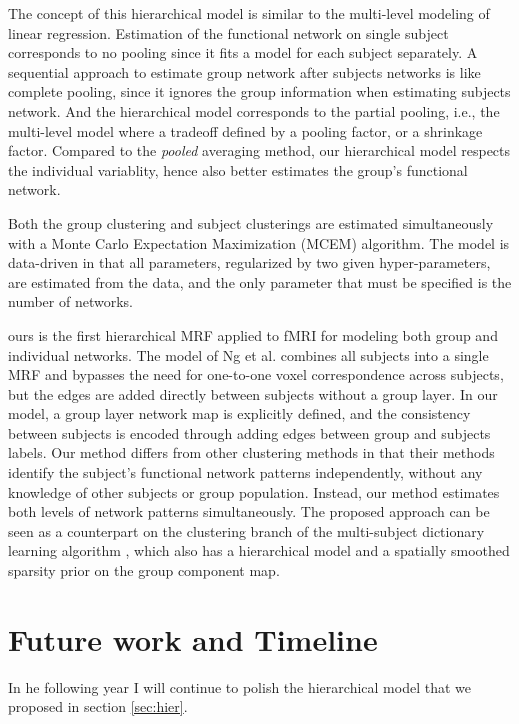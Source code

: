 \documentclass[12pt]{article}
\begin{document}
The concept of this hierarchical model is similar to the multi-level modeling of
linear regression. Estimation of the functional network on single
subject corresponds to no pooling since it fits a model for each subject
separately. A sequential approach to estimate group network after subjects
networks is like complete pooling, since it ignores the group information when
estimating subjects network. And the hierarchical model corresponds to the
partial pooling, i.e., the multi-level model where a tradeoff defined by a
pooling factor, or a shrinkage factor. Compared to the \emph{pooled} averaging
method, our hierarchical model respects the individual variablity, hence also
better estimates the group's functional network.

Both the group clustering and subject clusterings are estimated simultaneously
with a Monte Carlo Expectation Maximization (MCEM) algorithm.  The model is
data-driven in that all parameters, regularized by two given hyper-parameters,
are estimated from the data, and the only parameter that must be specified is
the number of networks.

ours is the first hierarchical MRF applied to fMRI for modeling both
group and individual networks. The model of Ng et al. \cite{ng2010group}
combines all subjects into a single MRF and bypasses the need for one-to-one
voxel correspondence across subjects, but the edges are added directly between
subjects without a group layer. In our model, a group layer network map is
explicitly defined, and the consistency between subjects is encoded through
adding edges between group and subjects labels. Our method differs from other
clustering methods \cite{bellec2010multi,van2008normalized} in that their
methods identify the subject's functional network patterns independently,
without any knowledge of other subjects or group population. Instead, our method
estimates both levels of network patterns simultaneously.  The proposed approach
can be seen as a counterpart on the clustering branch of the multi-subject
dictionary learning algorithm \cite{varoquaux2011multi}, which also has a
hierarchical model and a spatially smoothed sparsity prior on the group
component map.

\section{Future work and Timeline} 

In he following year I will continue to polish the hierarchical model that we proposed in section \ref{sec:hier}. 
\end{document}
